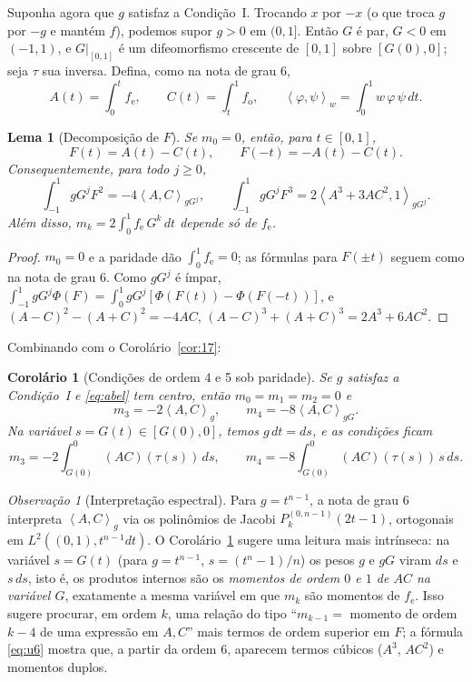 \documentclass[11pt]{article}
\theoremstyle{plain}
\newtheorem{lemma}[theorem]{Lema}
\newtheorem{corollary}[theorem]{Corolário}
\theoremstyle{definition}
\theoremstyle{remark}
\newtheorem{remark}[theorem]{Observação}
\newcommand{\fe}{f_{\mathrm e}}
\newcommand{\fo}{f_{\mathrm o}}
\newcommand{\ip}[2]{\left\langle #1,#2\right\rangle}
\begin{document}
Suponha agora que $g$ satisfaz a Condição~I. Trocando $x$ por $-x$ (o que troca
$g$ por $-g$ e mantém $f$), podemos supor $g>0$ em $(0,1]$. Então $G$ é par,
$G<0$ em $(-1,1)$, e $G|_{[0,1]}$ é um difeomorfismo crescente de $[0,1]$ sobre
$[G(0),0]$; seja $\tau$ sua inversa. Defina, como na nota de grau 6,
\[
 A(t)=\int_0^t\fe,\qquad C(t)=\int_t^1\fo,\qquad
 \ip{\varphi}{\psi}_w=\int_0^1 w\,\varphi\,\psi\,dt .
\]

\begin{lemma}[Decomposição de $F$]\label{lem:par}
Se $m_0=0$, então, para $t\in[0,1]$,
\[
 F(t)=A(t)-C(t),\qquad F(-t)=-A(t)-C(t).
\]
Consequentemente, para todo $j\ge0$,
\[
 \int_{-1}^1 gG^jF^2=-4\ip{A}{C}_{gG^j},\qquad
 \int_{-1}^1 gG^jF^3=2\ip{A^3+3AC^2}{1}_{gG^j}.
\]
Além disso, $m_k=2\int_0^1\fe\,G^k\,dt$ depende só de $\fe$.
\end{lemma}

\begin{proof}
$m_0=0$ e a paridade dão $\int_0^1\fe=0$; as fórmulas para $F(\pm t)$ seguem
como na nota de grau 6. Como $gG^j$ é ímpar,
$\int_{-1}^1 gG^j\Phi(F)=\int_0^1 gG^j[\Phi(F(t))-\Phi(F(-t))]$, e
$(A-C)^2-(A+C)^2=-4AC$, $(A-C)^3+(A+C)^3=2A^3+6AC^2$.
\end{proof}

Combinando com o Corolário~\ref{cor:17}:

\begin{corollary}[Condições de ordem 4 e 5 sob paridade]\label{cor:paridade}
Se $g$ satisfaz a Condição~I e \eqref{eq:abel} tem centro, então
$m_0=m_1=m_2=0$ e
\[
 m_3=-2\ip{A}{C}_{g},\qquad m_4=-8\ip{A}{C}_{gG}.
\]
Na variável $s=G(t)\in[G(0),0]$, temos $g\,dt=ds$, e as condições ficam
\[
 m_3=-2\int_{G(0)}^0(AC)(\tau(s))\,ds,\qquad
 m_4=-8\int_{G(0)}^0(AC)(\tau(s))\,s\,ds .
\]
\end{corollary}

\begin{remark}[Interpretação espectral]
Para $g=t^{n-1}$, a nota de grau 6 interpreta $\ip{A}{C}_g$ via os polinômios de
Jacobi $P_k^{(0,n-1)}(2t-1)$, ortogonais em $L^2((0,1),t^{n-1}dt)$. O
Corolário~\ref{cor:paridade} sugere uma leitura mais intrínseca: na variável
$s=G(t)$ (para $g=t^{n-1}$, $s=(t^n-1)/n$) os pesos $g$ e $gG$ viram $ds$ e
$s\,ds$, isto é, os produtos internos são os \emph{momentos de ordem $0$ e $1$
de $AC$ na variável $G$}, exatamente a mesma variável em que $m_k$ são momentos
de $\fe$. Isso sugere procurar, em ordem $k$, uma relação do tipo
``$m_{k-1}=$ momento de ordem $k-4$ de uma expressão em $A,C$'' mais termos de
ordem superior em $F$; a fórmula \eqref{eq:u6} mostra que, a partir da ordem 6,
aparecem termos cúbicos ($A^3$, $AC^2$) e momentos duplos.
\end{remark}
\end{document}
